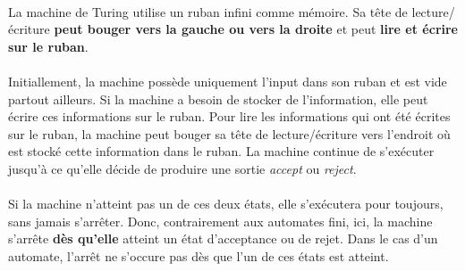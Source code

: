 \paragraph{}
La machine de Turing utilise un ruban infini comme mémoire. Sa tête de lecture/écriture \textbf{peut bouger vers la gauche ou vers la droite} et peut \textbf{lire et écrire sur le ruban}.
\paragraph{}
Initiallement, la machine possède uniquement l'input dans son ruban et est vide partout ailleurs. Si la machine a besoin de stocker de l'information, elle peut écrire ces informations sur le ruban. Pour lire les informations qui ont été écrites sur le ruban, la machine peut bouger sa tête de lecture/écriture vers l'endroit où est stocké cette information dans le ruban. La machine continue de s'exécuter jusqu'à ce qu'elle décide de produire une sortie \textit{accept} ou \textit{reject}. 

\paragraph{}
Si la machine n'atteint pas un de ces deux états, elle s'exécutera pour toujours, sans jamais s'arrêter. Donc, contrairement aux automates fini, ici, la machine s'arrête \textbf{dès qu'elle} atteint un état d'acceptance ou de rejet. Dans le cas d'un automate, l'arrêt ne s'occure pas dès que l'un de ces états est atteint.
